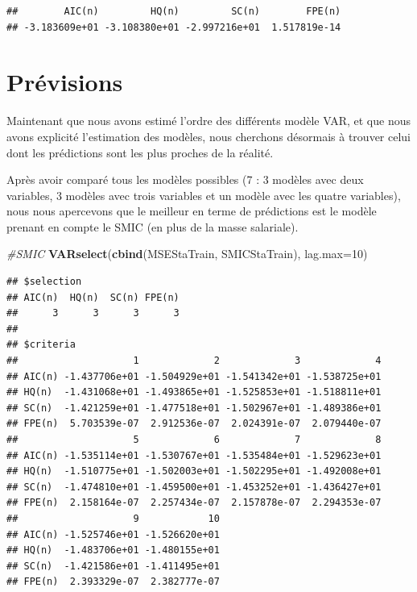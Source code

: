 \documentclass[11pt,]{article}
\newenvironment{Shaded}{\begin{snugshade}}{\end{snugshade}}
\newcommand{\KeywordTok}[1]{\textcolor[rgb]{0.13,0.29,0.53}{\textbf{{#1}}}}
\newcommand{\DataTypeTok}[1]{\textcolor[rgb]{0.13,0.29,0.53}{{#1}}}
\newcommand{\DecValTok}[1]{\textcolor[rgb]{0.00,0.00,0.81}{{#1}}}
\newcommand{\CommentTok}[1]{\textcolor[rgb]{0.56,0.35,0.01}{\textit{{#1}}}}
\newcommand{\NormalTok}[1]{{#1}}
\begin{document}
\begin{Shaded}
\end{Shaded}

\begin{verbatim}
##        AIC(n)         HQ(n)         SC(n)        FPE(n) 
## -3.183609e+01 -3.108380e+01 -2.997216e+01  1.517819e-14
\end{verbatim}

\section{Prévisions}\label{previsions}

Maintenant que nous avons estimé l'ordre des différents modèle VAR, et
que nous avons explicité l'estimation des modèles, nous cherchons
désormais à trouver celui dont les prédictions sont les plus proches de
la réalité.

Après avoir comparé tous les modèles possibles (7 : 3 modèles avec deux
variables, 3 modèles avec trois variables et un modèle avec les quatre
variables), nous nous apercevons que le meilleur en terme de prédictions
est le modèle prenant en compte le SMIC (en plus de la masse salariale).

\begin{Shaded}
\begin{Highlighting}[]
\CommentTok{#SMIC}
\KeywordTok{VARselect}\NormalTok{(}\KeywordTok{cbind}\NormalTok{(MSEStaTrain, SMICStaTrain), }\DataTypeTok{lag.max=}\DecValTok{10}\NormalTok{)}
\end{Highlighting}
\end{Shaded}

\begin{verbatim}
## $selection
## AIC(n)  HQ(n)  SC(n) FPE(n) 
##      3      3      3      3 
## 
## $criteria
##                    1             2             3             4
## AIC(n) -1.437706e+01 -1.504929e+01 -1.541342e+01 -1.538725e+01
## HQ(n)  -1.431068e+01 -1.493865e+01 -1.525853e+01 -1.518811e+01
## SC(n)  -1.421259e+01 -1.477518e+01 -1.502967e+01 -1.489386e+01
## FPE(n)  5.703539e-07  2.912536e-07  2.024391e-07  2.079440e-07
##                    5             6             7             8
## AIC(n) -1.535114e+01 -1.530767e+01 -1.535484e+01 -1.529623e+01
## HQ(n)  -1.510775e+01 -1.502003e+01 -1.502295e+01 -1.492008e+01
## SC(n)  -1.474810e+01 -1.459500e+01 -1.453252e+01 -1.436427e+01
## FPE(n)  2.158164e-07  2.257434e-07  2.157878e-07  2.294353e-07
##                    9            10
## AIC(n) -1.525746e+01 -1.526620e+01
## HQ(n)  -1.483706e+01 -1.480155e+01
## SC(n)  -1.421586e+01 -1.411495e+01
## FPE(n)  2.393329e-07  2.382777e-07
\end{verbatim}
\end{document}
